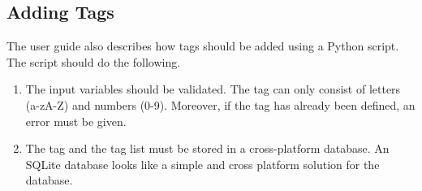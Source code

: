 \subsection{Adding Tags}
\label{task:20140316_jkn1}
\label{task:20140316_1}
The user guide also describes how tags should be added using a Python script. The script should do the following.
\begin{enumerate}
  \item The input variables should be validated. The tag can only consist of letters (a-zA-Z) and numbers (0-9). Moreover, if the tag has already been defined, an error must be given.
  \item The tag and the tag list must be stored in a cross-platform database. An SQLite database looks like a simple and cross platform solution for the database.
\end{enumerate}
